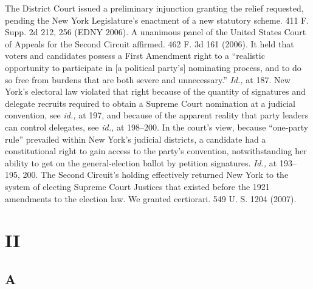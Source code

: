  The District Court issued a preliminary injunction granting the relief requested, pending the New York Legislature's enactment of a new statutory scheme. 411 F. Supp. 2d 212, 256 (EDNY 2006). A unanimous panel of the United States Court of Appeals for the Second Circuit affirmed. 462 F. 3d 161 (2006). It held that voters and candidates possess a First Amendment right to a ``realistic opportunity to participate in [a political party's] nominating process, and to do so free from burdens that are both severe and unnecessary.'' \emph{Id.,} at 187. New York's electoral law violated that right because of the quantity of signatures and delegate recruits required to obtain a Supreme Court nomination at a judicial convention, see \emph{id.,} at 197, and because of the apparent reality that party leaders can control delegates, see \emph{id.,} at 198--200. In the court's view, because ``one-party rule'' prevailed within New York's judicial districts, a candidate had a constitutional right to gain access to the party's convention, notwithstanding her ability to get on the general-election ballot by petition signatures. \emph{Id.,} at 193--195, 200. The Second Circuit's holding effectively returned New York to the system of electing Supreme Court Justices that existed before the 1921 amendments to the election law. We granted certiorari. 549 U. S. 1204 (2007).

\section{II}

\subsection{A}

